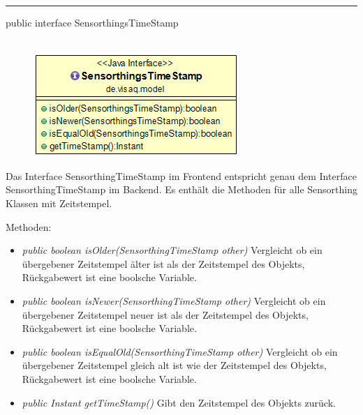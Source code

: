 \rule{\textwidth}{0.4pt}
public interface SensorthingsTimeStamp
\\\\
\begin{minipage}{0.3\textwidth}
	\begin{figure}[H]
		\includegraphics[scale = 0.5
		]{media/frontend/model/SensorthingTimeStampClass.png}
	\end{figure}
\end{minipage} \hfill
\begin{minipage}{0.6\textwidth}
	Das Interface SensorthingTimeStamp im Frontend entspricht genau dem Interface SensorthingTimeStamp im Backend. Es enthält die Methoden für alle Sensorthing Klassen mit Zeitstempel.
\end{minipage}

Methoden:
\begin{itemize} 
	\item \emph{public boolean isOlder(SensorthingTimeStamp other)} Vergleicht ob ein übergebener Zeitstempel älter ist als der Zeitstempel des Objekts, Rückgabewert ist eine boolsche Variable.
	\item \emph{public boolean isNewer(SensorthingTimeStamp other)} Vergleicht ob ein übergebener Zeitstempel neuer ist als der Zeitstempel des Objekts, Rückgabewert ist eine boolsche Variable.
	\item \emph{public boolean isEqualOld(SensorthingTimeStamp other)} Vergleicht ob ein übergebener Zeitstempel gleich alt ist wie der Zeitstempel des Objekts, Rückgabewert ist eine boolsche Variable.
	\item \emph{public Instant getTimeStamp()} Gibt den Zeitstempel des Objekts zurück.
\end{itemize}

